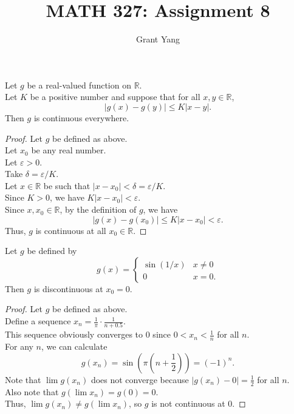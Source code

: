 \documentclass{article}
\newenvironment{theorem}[1]{\renewcommand\theinnercustomthm{#1}\innercustomthm}
  {\endinnercustomthm}
\begin{document}
\title{MATH 327: Assignment 8}
\author{Grant Yang}
\maketitle

\begin{theorem}{1}
    Let $g$ be a real-valued function on $\mathbb R$. \\
    Let $K$ be a positive number and suppose that for all $x,y \in \mathbb R$,
    \[|g(x)-g(y)| \le K|x-y|.\]
    Then $g$ is continuous everywhere.
\end{theorem}
\begin{proof}
    Let $g$ be defined as above. \\
    Let $x_0$ be any real number. \\
    Let $\varepsilon > 0$. \\
    Take $\delta =\varepsilon / K$. \\
    Let $x \in \mathbb R$ be such that $|x-x_0| < \delta = \varepsilon/K$. \\
    Since $K > 0$, we have $K |x-x_0| < \varepsilon$. \\
    Since $x,x_0 \in \mathbb R$, by the definition of $g$, we have
    \[|g(x)-g(x_0)| \le K|x-x_0| < \varepsilon.\]
    Thus, $g$ is continuous at all $x_0 \in \mathbb R$.
\end{proof}

\newpage{}
\begin{theorem}{2}
    Let $g$ be defined by
    \[g(x)=\begin{cases}\sin(1/x) & x \neq 0 \\ 0 & x=0.\end{cases}\]
    Then $g$ is discontinuous at $x_0 = 0$.
\end{theorem}
\begin{proof}
    Let $g$ be defined as above. \\
    Define a sequence $x_n = \frac{1}{\pi}\cdot \frac{1}{n+0.5}$. \\
    This sequence obviously converges to $0$ since $0<x_n < \frac{1}{n}$ for all $n$. \\
    For any $n$, we can calculate \[g(x_n) = \sin\left(\pi \left(n+\frac{1}{2}\right)\right) = (-1)^n.\]
    Note that $\lim g(x_n)$ does not converge because $|g(x_n) - 0| = \frac{1}{2}$ for all $n$. \\
    Also note that $g(\lim x_n) = g(0) = 0$. \\
    Thus, $\lim g(x_n) \neq g(\lim x_n)$, so $g$ is not continuous at $0$.
\end{proof}
\end{document}
